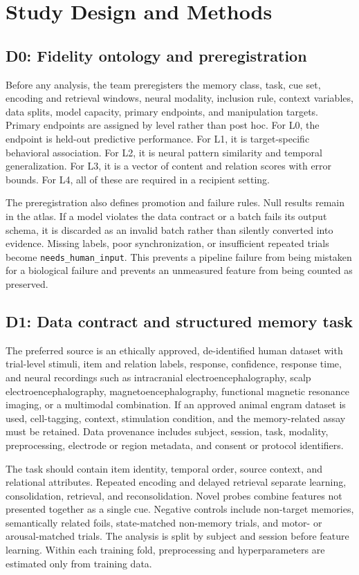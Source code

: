 \documentclass[conference]{IEEEtran}
\begin{document}
\section{Study Design and Methods}
\subsection{D0: Fidelity ontology and preregistration}
Before any analysis, the team preregisters the memory class, task, cue set, encoding and retrieval windows, neural modality, inclusion rule, context variables, data splits, model capacity, primary endpoints, and manipulation targets. Primary endpoints are assigned by level rather than post hoc. For L0, the endpoint is held-out predictive performance. For L1, it is target-specific behavioral association. For L2, it is neural pattern similarity and temporal generalization. For L3, it is a vector of content and relation scores with error bounds. For L4, all of these are required in a recipient setting.

The preregistration also defines promotion and failure rules. Null results remain in the atlas. If a model violates the data contract or a batch fails its output schema, it is discarded as an invalid batch rather than silently converted into evidence. Missing labels, poor synchronization, or insufficient repeated trials become \texttt{needs\_human\_input}. This prevents a pipeline failure from being mistaken for a biological failure and prevents an unmeasured feature from being counted as preserved.

\subsection{D1: Data contract and structured memory task}
The preferred source is an ethically approved, de-identified human dataset with trial-level stimuli, item and relation labels, response, confidence, response time, and neural recordings such as intracranial electroencephalography, scalp electroencephalography, magnetoencephalography, functional magnetic resonance imaging, or a multimodal combination. If an approved animal engram dataset is used, cell-tagging, context, stimulation condition, and the memory-related assay must be retained. Data provenance includes subject, session, task, modality, preprocessing, electrode or region metadata, and consent or protocol identifiers.

The task should contain item identity, temporal order, source context, and relational attributes. Repeated encoding and delayed retrieval separate learning, consolidation, retrieval, and reconsolidation. Novel probes combine features not presented together as a single cue. Negative controls include non-target memories, semantically related foils, state-matched non-memory trials, and motor- or arousal-matched trials. The analysis is split by subject and session before feature learning. Within each training fold, preprocessing and hyperparameters are estimated only from training data.
\end{document}
